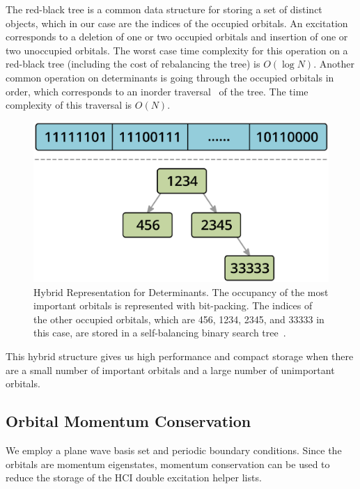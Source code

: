 \documentclass[%
reprint,
 superscriptaddress,
 amsmath,amssymb,
 aps,
]{revtex4-1}
\begin{document}
The red-black tree is a common data structure for storing a set of distinct objects, which in our case are the indices of the occupied orbitals.
An excitation corresponds to a deletion of one or two occupied orbitals and insertion of one or two unoccupied orbitals.
The worst case time complexity for this operation on a red-black tree (including the cost of rebalancing the tree) is $O(\log N)$.
Another common operation on determinants is going through the occupied orbitals in order, which corresponds to an inorder traversal~\cite{wiki:treetraversal} of the tree.
The time complexity of this traversal is $O(N)$.
\begin{figure}
  \begin{center}
  \includegraphics[width=0.9\linewidth]{figs/HybridDet.eps}
  \end{center}
  \vspace{-0.2cm}
  \caption{Hybrid Representation for Determinants.
  The occupancy of the most important orbitals is represented with bit-packing.
  The indices of the other occupied orbitals, which are 456, 1234, 2345, and 33333 in this case, are stored in a self-balancing binary search tree~\cite{wiki:redblacktree}.
  }
  \label{fig:hybrid}
\end{figure}
This hybrid structure gives us high performance and compact storage when there are a small number of important orbitals and a large number of unimportant orbitals.

\subsection{Orbital Momentum Conservation}
We employ a plane wave basis set and periodic boundary conditions.
Since the orbitals are momentum eigenstates, momentum conservation can be used
to reduce the storage of the HCI double excitation helper lists.
\end{document}
